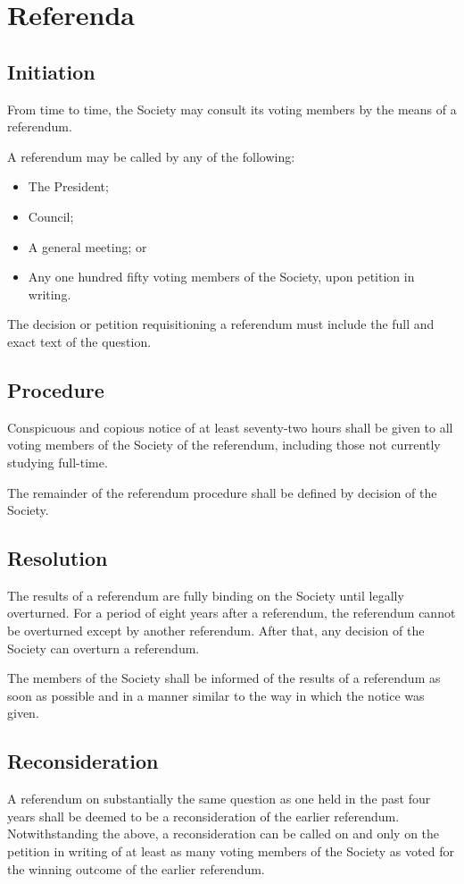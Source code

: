 \section{Referenda}
\subsection{Initiation}
From time to time, the Society may consult its voting members by the means of a
referendum.

A referendum may be called by any of the following:
\begin{itemize}
  \item The President;
  \item Council;
  \item A general meeting; or
  \item Any one hundred fifty voting members of the Society, upon petition in
    writing.
\end{itemize}

The decision or petition requisitioning a referendum must include the full and
exact text of the question.

\subsection{Procedure}
Conspicuous and copious notice of at least seventy-two hours shall be given to
all voting members of the Society of the referendum, including those not
currently studying full-time.

The remainder of the referendum procedure shall be defined by decision of the
Society.

\subsection{Resolution}
The results of a referendum are fully binding on the Society until legally
overturned. For a period of eight years after a referendum, the referendum
cannot be overturned except by another referendum. After that, any decision of
the Society can overturn a referendum.

The members of the Society shall be informed of the results of a referendum as
soon as possible and in a manner similar to the way in which the notice was
given.

\subsection{Reconsideration}
A referendum on substantially the same question as one held in the past four
years shall be deemed to be a reconsideration of the earlier referendum.
Notwithstanding the above, a reconsideration can be called on and only on the
petition in writing of at least as many voting members of the Society as voted
for the winning outcome of the earlier referendum.

